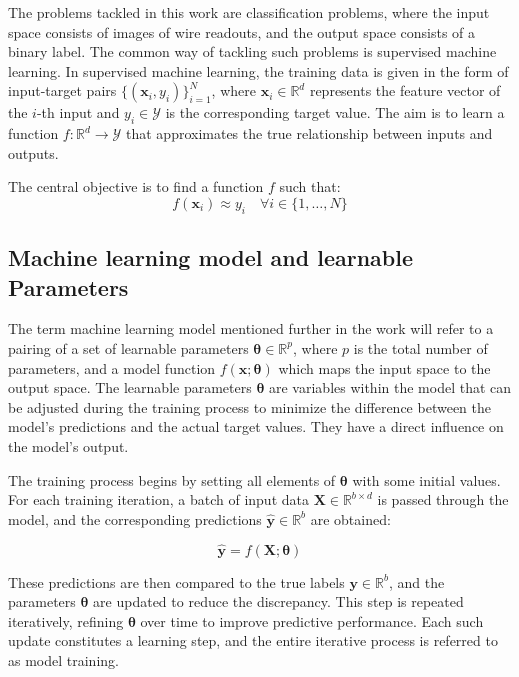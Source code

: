 \documentclass{pracalicmgr}
\begin{document}
The problems tackled in this work are classification problems, where the input space consists of images of wire readouts, and the output space consists of a binary label. The common way of tackling such problems is supervised machine learning.
In supervised machine learning, the training data is given in the form of input-target pairs \( \{(\mathbf{x}_i, y_i)\}_{i=1}^N \), where \( \mathbf{x}_i \in \mathbb{R}^d \) represents the feature vector of the \( i \)-th input and \( y_i \in \mathcal{Y} \) is the corresponding target value. The aim is to learn a function \( f: \mathbb{R}^d \rightarrow \mathcal{Y} \) that approximates the true relationship between inputs and outputs.

The central objective is to find a function \( f \) such that:
\[
f(\mathbf{x}_i) \approx y_i \quad \forall i \in \{1, \dots, N\}
\]

\subsection{Machine learning model and learnable Parameters}

The term machine learning model mentioned further in the work will refer to a pairing of a set of learnable parameters \( \boldsymbol{\theta} \in \mathbb{R}^p \), where \( p \) is the total number of parameters, and a model function \( f(\mathbf{x}; \boldsymbol{\theta}) \) which maps the input space to the output space. The learnable parameters \( \boldsymbol{\theta} \) are variables within the model that can be adjusted during the training process to minimize the difference between the model's predictions and the actual target values. They have a direct influence on the model's output.


The training process begins by setting all elements of \( \boldsymbol{\theta} \) with some initial values. For each training iteration, a batch of input data \( \mathbf{X} \in \mathbb{R}^{b \times d} \) is passed through the model, and the corresponding predictions \( \hat{\mathbf{y}} \in \mathbb{R}^b \) are obtained:

\[
\hat{\mathbf{y}} = f(\mathbf{X}; \boldsymbol{\theta})
\]

These predictions are then compared to the true labels \( \mathbf{y} \in \mathbb{R}^b \), and the parameters \( \boldsymbol{\theta} \) are updated to reduce the discrepancy. This step is repeated iteratively, refining \( \boldsymbol{\theta} \) over time to improve predictive performance. Each such update constitutes a learning step, and the entire iterative process is referred to as model training.
\end{document}
